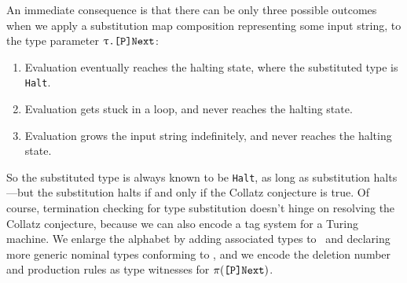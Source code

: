 \documentclass[../generics]{subfiles}
\begin{document}
An immediate consequence is that there can be only three possible outcomes when we apply a substitution map composition representing some input string, to the type parameter $\texttt{$\uptau$.[P]Next}$:
\begin{enumerate}
\item Evaluation eventually reaches the halting state, where the substituted type is \texttt{Halt}.
\item Evaluation gets stuck in a loop, and never reaches the halting state.
\item Evaluation grows the input string indefinitely, and never reaches the halting state.
\end{enumerate}
So the substituted type is always known to be \texttt{Halt}, as long as substitution halts---but the substitution halts if and only if the Collatz conjecture is true. Of course, termination checking for type substitution doesn't hinge on resolving the Collatz conjecture, because  we can also encode a tag system for a Turing machine. We enlarge the alphabet by adding associated types to \tP\ and declaring more generic nominal types conforming to \tP, and we encode the deletion number and production rules as type witnesses for $\pi(\texttt{[P]Next})$. 

\eject
\end{document}
